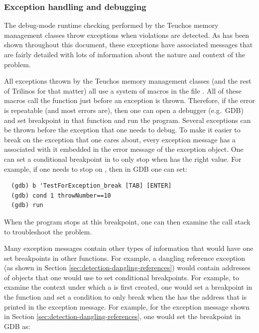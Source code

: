 \documentclass[pdf,ps2pdf,11pt]{SANDreport}
\begin{document}
%
{}\subsubsection{Exception handling and debugging}
\label{sec:except-handling-debugging}
%

The debug-mode runtime checking performed by the Teuchos memory
management classes throw exceptions when violations are detected.  As
has been shown throughout this document, these exceptions have
associated messages that are fairly detailed with lots of information
about the nature and context of the problem.

All exceptions thrown by the Teuchos memory management classes (and
the rest of Trilinos for that matter) all use a system of macros in
the file {}.  All of these macros
call the function {} just before an
exception is thrown.  Therefore, if the error is repeatable (and most
errors are), then one can open a debugger (e.g.\ GDB) and set
breakpoint in that function and run the program.  Several exceptions
can be thrown before the exception that one needs to debug.  To make
it easier to break on the exception that one cares about, every
exception message has a {} associated with it
embedded in the error message of the exception object.  One can set a
conditional breakpoint in {} to only
stop when {} has the right value.  For example, if
one needs to stop on {}, then in GDB one can
set:

{\small\begin{verbatim}
  (gdb) b 'TestForException_break [TAB] [ENTER]
  (gdb) cond 1 throwNumber==10
  (gdb) run
\end{verbatim}}

When the program stops at this breakpoint, one can then examine the
call stack to troubleshoot the problem.

Many exception messages contain other types of information that would
have one set breakpoints in other functions.  For example, a dangling
reference exception (as shown in Section
{}\ref{sec:detection-dangling-references}) would contain addresses of
objects that one would use to set conditional breakpoints.  For
example, to examine the context under which a {} is first
created, one would set a breakpoint in the function
{} and set a condition
to only break when the {} has the address that is printed
in the exception message.  For example, for the exception message
shown in Section {}\ref{sec:detection-dangling-references}, one would
set the breakpoint in GDB as:
\end{document}
